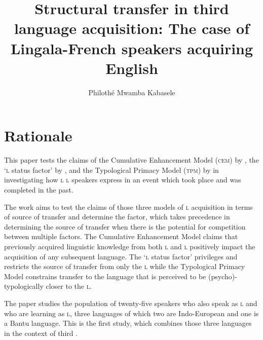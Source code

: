 \documentclass[output=paper,
modfonts
]{langscibook}
\title{Structural transfer in third language acquisition: The case of Lingala-French speakers acquiring English}
\author{Philothé Mwamba Kabasele \affiliation{University of Illinois at Urbana-Champaign, University of Calgary, Institut Superieur Pedagogique de la Gombe (RDC), University of KwaZulu-Natal }}
\begin{document}
\maketitle
\section{Rationale}\label{sec:kabasele:1}

This paper tests the claims of the Cumulative Enhancement Model (\textsc{cem}) by  \citet{FlynnEtAl2004}, the ‘\textsc{l} status factor’ by \citet{BardelFalk2007}, and the Typological Primacy Model (\textsc{tpm}) by \citet{Rothman2010,Rothman2011} in investigating how \textsc{l}  \textsc{l}  speakers express in  an event which took place and was completed in the past. 

The work aims to test the claims of those three models of \textsc{l} acquisition in terms of source of transfer and determine the factor, which takes precedence in determining the source of transfer when there is the potential for competition between multiple factors. The Cumulative Enhancement Model claims that previously acquired linguistic knowledge from both \textsc{l} and \textsc{l} positively impact the acquisition of any subsequent language. The ‘\textsc{l} status factor’ privileges and restricts the source of transfer from only the \textsc{l} while the Typological Primacy Model constrains transfer to the language that is perceived to be (psycho)-typologically closer to the \textsc{l}. 

The paper studies the population of twenty-five  speakers who also speak  as \textsc{l} and who are learning  as \textsc{l}, three languages of which two are Indo-European and one is a Bantu language. This is the first study, which combines those three languages in the context of third .
\end{document}
